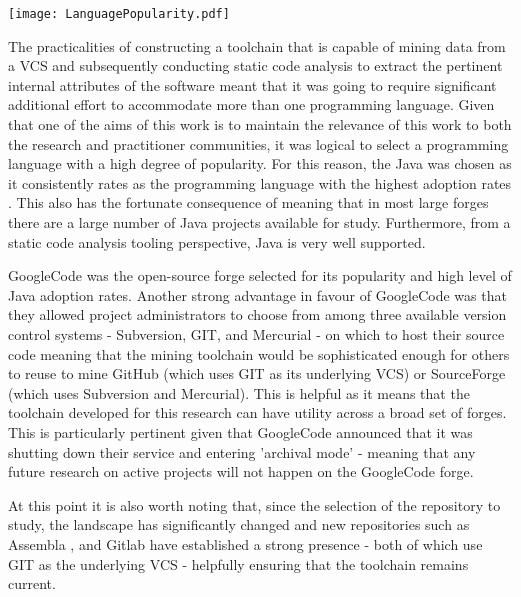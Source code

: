 \begin{table}
\centering 
{}
\begin{tabular}
 \centering 
 \texttt{[image: LanguagePopularity.pdf]}
 \label{tab:LanguagePopularity}
\end{tabular}
\end{table}


The practicalities of constructing a toolchain that is capable of mining data from a VCS and subsequently conducting static code analysis to extract the pertinent internal attributes of the software meant that it was going to require significant additional effort to accommodate more than one programming language. Given that one of the aims of this work is to maintain the relevance of this work to both the research and practitioner communities, it was logical to select a programming language with a high degree of popularity. For this reason, the Java was chosen as it consistently rates as the programming language with the highest adoption rates \citep{tiobe2017}. This also has the fortunate consequence of meaning that in most large forges there are a large number of Java projects available for study.  Furthermore, from a static code analysis tooling perspective, Java is very well supported.

GoogleCode was the open-source forge selected for its popularity and high level of Java adoption rates. Another strong advantage in favour of GoogleCode was that they allowed project administrators to choose from among three available version control systems - Subversion, GIT, and Mercurial - on which to host their source code meaning that the mining toolchain would be sophisticated enough for others to reuse to mine GitHub (which uses GIT as its underlying VCS) or SourceForge (which uses Subversion and Mercurial). This is helpful as it means that the toolchain developed for this research can have utility across a broad set of forges. This is particularly pertinent given that GoogleCode announced that it was shutting down their service and entering 'archival mode' - meaning that any future research on active projects will not happen on the GoogleCode forge. 

At this point it is also worth noting that, since the selection of the repository to study, the landscape has significantly changed and new repositories such as Assembla \citep{assembla}, and Gitlab \citep{gitlab} have established a strong presence - both of which use GIT as the underlying VCS - helpfully ensuring that the toolchain remains current.

